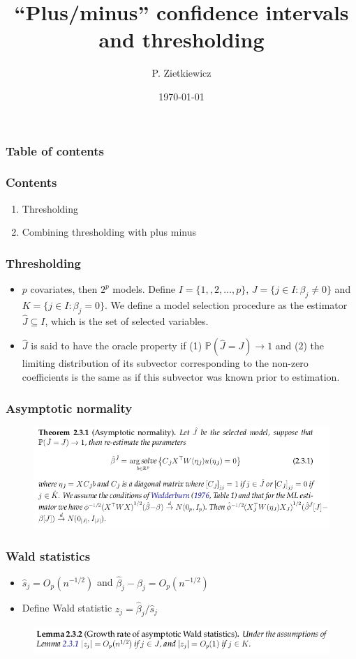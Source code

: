 \documentclass{beamer}
\title[``Plus/minus'' CIs]{``Plus/minus'' confidence intervals and thresholding}
\author[]{P. Zietkiewicz}
\date{\today}
\newcommand{\prob}[1]{\mathbb{P}(#1)}
\begin{document}
\frame{\titlepage}

\begin{frame}
	\frametitle{Table of contents}
	\tableofcontents
\end{frame}

\begin{frame}
  \frametitle{Contents}
  \begin{enumerate}
  \item Thresholding
  \item Combining thresholding with plus minus
  \end{enumerate}
\end{frame}

\begin{frame}
  \frametitle{Thresholding}
  \begin{itemize}
  \item $p$ covariates, then $2^p$ models. Define $I = \{1,,2,\dots,p\}$, $J = \{j \in I: \beta_j \ne 0\}$ and $K = \{j \in I: \beta_j = 0\}$. We define a model selection procedure as the estimator $\hat{J} \subseteq I$, which is the set of selected variables. 
  \item $\hat{J}$ is said to have the oracle property if (1) $\prob{\hat{J} = J} \to 1$ and (2) the limiting distribution of its subvector corresponding to the non-zero coefficients is the same as if this subvector was known prior to estimation.
  \end{itemize}
\end{frame}

\begin{frame}
  \frametitle{Asymptotic normality}
  \begin{figure}[h!]
    \centering
    \includegraphics[scale=0.4]{asymp_norm.png}
  \end{figure}
\end{frame}

\begin{frame}
  \frametitle{Wald statistics}
  \begin{itemize}
  \item $\hat{s}_j = O_p(n^{-1/2})$ and $\hat{\beta}_j - \beta_j = O_p(n^{-1/2})$
  \item Define Wald statistic $z_j = \hat{\beta}_j / \hat{s}_j$
  \end{itemize}
  \begin{figure}[h!]
    \centering
    \includegraphics[scale=0.4]{growth.png}
  \end{figure}
\end{frame}
\end{document}
